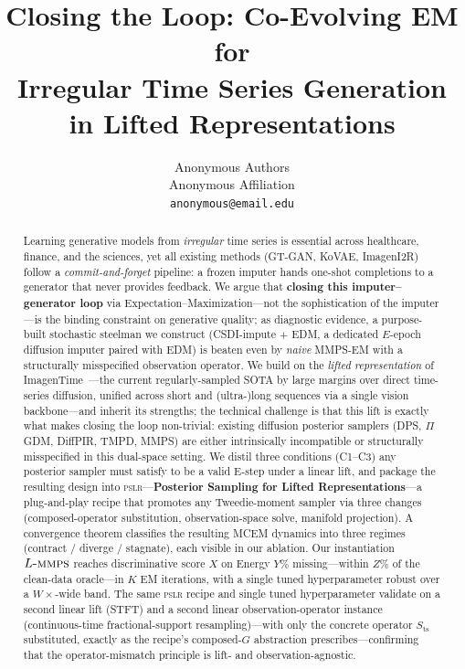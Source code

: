 \documentclass{article}
\title{Closing the Loop: Co-Evolving EM for \\ Irregular Time Series Generation in Lifted Representations}
\author{%
  Anonymous Authors \\
  Anonymous Affiliation \\
  \texttt{anonymous@email.edu} \\
}
\theoremstyle{plain}
\theoremstyle{definition}
\theoremstyle{remark}
\newcommand{\pslr}{\textsc{pslr}}
\newcommand{\lmmps}{L\mbox{-}\textsc{mmps}}
\begin{document}
\maketitle

\begin{abstract}
Learning generative models from \emph{irregular} time series is essential across healthcare, finance, and the sciences, yet all existing methods (GT-GAN, KoVAE, ImagenI2R) follow a \emph{commit-and-forget} pipeline: a frozen imputer hands one-shot completions to a generator that never provides feedback. We argue that \textbf{closing this imputer--generator loop} via Expectation--Maximization---not the sophistication of the imputer---is the binding constraint on generative quality; as diagnostic evidence, a purpose-built stochastic steelman we construct (CSDI-impute $+$ EDM, a dedicated $E$-epoch diffusion imputer paired with EDM) is beaten even by \emph{naive} MMPS-EM with a structurally misspecified observation operator. We build on the \emph{lifted representation} of ImagenTime~\citep{naiman2024imagentime}---the current regularly-sampled SOTA by large margins over direct time-series diffusion, unified across short and (ultra-)long sequences via a single vision backbone---and inherit its strengths; the technical challenge is that this lift is exactly what makes closing the loop non-trivial: existing diffusion posterior samplers (DPS, $\Pi$GDM, DiffPIR, TMPD, MMPS) are either intrinsically incompatible or structurally misspecified in this dual-space setting. We distil three conditions (C1--C3) any posterior sampler must satisfy to be a valid E-step under a linear lift, and package the resulting design into \pslr{}---\textbf{Posterior Sampling for Lifted Representations}---a plug-and-play recipe that promotes any Tweedie-moment sampler via three changes (composed-operator substitution, observation-space solve, manifold projection). A convergence theorem classifies the resulting MCEM dynamics into three regimes (contract / diverge / stagnate), each visible in our ablation. Our instantiation $\lmmps$ reaches discriminative score $X$ on Energy $Y\%$ missing---within $Z\%$ of the clean-data oracle---in $K$ EM iterations, with a single tuned hyperparameter robust over a $W\times$-wide band. The same \pslr{} recipe and single tuned hyperparameter validate on a second linear lift (STFT) and a second linear observation-operator instance (continuous-time fractional-support resampling)---with only the concrete operator $S_{\mathrm{ts}}$ substituted, exactly as the recipe's composed-$G$ abstraction prescribes---confirming that the operator-mismatch principle is lift- and observation-agnostic.
\end{abstract}
\end{document}
